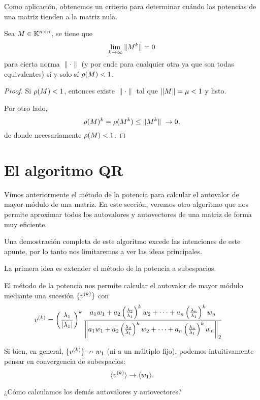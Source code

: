 Como aplicación, obtenemos un criterio para determinar cuándo las potencias de una matriz tienden a la matriz nula.

\tcc
\begin{prop}
 Sea $\Mb\in \Knn$, se tiene que
 $$
 \lim_{k\to \infty}\|\Mb^k\|=0
 $$
para cierta norma $\|\cdot\|$ (y por ende para cualquier otra ya que son todas equivalentes) sí y solo sí
 $\rho(\Mb)<1$.
\end{prop}

\etcc

\begin{proof}
 Si $\rho(\Mb)<1$, entonces existe $\|\cdot\|$ tal que $\|\Mb\|=\mu<1$ y listo.

 Por otro lado,
 $$
 \rho(\Mb)^k=
 \rho(\Mb^k)\le
 \|\Mb^k\|\ \to 0,
 $$
 de donde
 necesariamente
 $\rho(\Mb)<1$.
\end{proof}
 
\section{El algoritmo QR}

Vimos anteriormente el método de la potencia para calcular el autovalor de mayor módulo de una matriz. En este sección, veremos otro algoritmo que nos permite aproximar todos los autovalores y autovectores de una matriz de forma muy eficiente.

Una demostración completa de este algoritmo excede las intenciones de este apunte, por lo tanto nos limitaremos a ver las ideas principales.

La primera idea es extender el método de la potencia a subespacios.

El método de la potencia nos permite calcular el autovalor de mayor módulo mediante una sucesión $\{\vb^{(k)}\}$ con
$$
\begin{aligned}
\vb^{(k)} &= \left(\frac{\lambda_1}{|\lambda_1|}\right)^k \frac{a_1   \wb_1 + a_2 \left(\frac{\lambda_2}{\lambda_1}\right)^k \wb_2+ \dots + a_n \left(\frac{\lambda_n}{\lambda_1}\right)^k \wb_n}{\left\|a_1 \wb_1 + a_2 \left(\frac{\lambda_2}{\lambda_1}\right)^k \wb_2+ \dots + a_n \left(\frac{\lambda_n}{\lambda_1}\right)^k \wb_n\right\|_2}
\end{aligned}$$

Si bien, en general, $\{\vb^{(k)}\} \nrightarrow \wb_1$ (ni a un múltiplo fijo), podemos intuitivamente pensar en convergencia de subespacios:
$$
\langle \vb^{(k)}\rangle \rightarrow \langle \wb_1 \rangle.
$$

¿Cómo calculamos los demás autovalores y autovectores?


